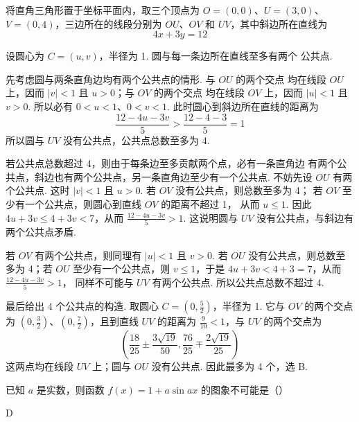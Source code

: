 \begin{solution}
将直角三角形置于坐标平面内，取三个顶点为
\(O=(0,0)\)、\(U=(3,0)\)、\(V=(0,4)\)，三边所在的线段分别为
\(OU\)、\(OV\) 和 \(UV\)，其中斜边所在直线为
\[
4x+3y=12
\]

设圆心为 \(C=(u,v)\)，半径为 1. 圆与每一条边所在直线至多有两个
公共点.

先考虑圆与两条直角边均有两个公共点的情形. 与 \(OU\) 的两个交点
均在线段 \(OU\) 上，因而 \(|v|<1\) 且 \(u>0\)；与 \(OV\) 的两个交点
均在线段 \(OV\) 上，因而 \(|u|<1\) 且 \(v>0\).
所以必有 \(0<u<1\)、\(0<v<1\). 此时圆心到斜边所在直线的距离为
\[
\frac{12-4u-3v}{5}>\frac{12-4-3}{5}=1
\]
所以圆与 \(UV\) 没有公共点，公共点总数至多为 4.

若公共点总数超过 4，则由于每条边至多贡献两个点，必有一条直角边
有两个公共点，斜边也有两个公共点，另一条直角边至少有一个公共点.
不妨先设 \(OU\) 有两个公共点.
这时 \(|v|<1\) 且 \(u>0\). 若 \(OV\) 没有公共点，则总数至多为 4；
若 \(OV\) 至少有一个公共点，则圆心到直线 \(OV\) 的距离不超过 1，
从而 \(u\leqslant1\). 因此
\(4u+3v\leqslant4+3v<7\)，从而
\(\frac{12-4u-3v}{5}>1\).
这说明圆与 \(UV\) 没有公共点，与斜边有两个公共点矛盾.

若 \(OV\) 有两个公共点，则同理有 \(|u|<1\) 且 \(v>0\). 若 \(OU\)
没有公共点，则总数至多为 4；若 \(OU\) 至少有一个公共点，则
\(v\leqslant1\)，于是
\(4u+3v<4+3=7\)，从而
\(\frac{12-4u-3v}{5}>1\)，
同样不可能与 \(UV\) 有两个公共点. 所以公共点总数不超过 4.

最后给出 4 个公共点的构造. 取圆心 \(C=(0,\frac52)\)，半径为 1.
它与 \(OV\) 的两个交点为
\((0,\frac32)\)、\((0,\frac72)\)，且到直线 \(UV\) 的距离为
\(\frac9{10}<1\)，与 \(UV\) 的两个交点为
\[
\left(\frac{18}{25}\pm\frac{3\sqrt{19}}{50},
\frac{76}{25}\mp\frac{2\sqrt{19}}{25}\right)
\]
这两点均在线段 \(UV\) 上；圆与 \(OU\) 没有公共点. 因此最多为 4 个，选 B.
\end{solution}

\begin{problem}
已知 \(a\) 是实数，则函数 \(f(x) = 1 + a \sin ax\) 的图象不可能是（\quad）

    {}
    {}
    {}
\end{problem}

\begin{answer}
D
\end{answer}

